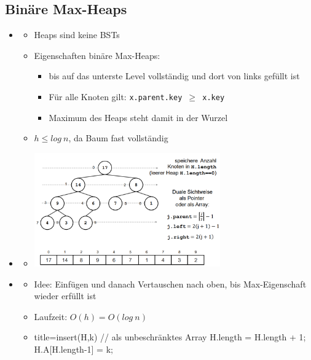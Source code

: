 \documentclass[
    12pt,
    a4paper,
    ngerman,
    color=3b,%
    marginpar=false,
    colorback=false,
    leqno,
]{tudaexercise}
\begin{document}
    \subsection{Binäre Max-Heaps}\label{Binaere Max-Heaps}
    \begin{itemize}
        \item {}
            \begin{itemize}
                \item Heaps sind keine BSTs
                \item Eigenschaften binäre Max-Heaps:
                    \begin{itemize}
                        \item bis auf das unterste Level vollständig und dort von links gefüllt ist
                        \item Für alle Knoten gilt: \texttt{x.parent.key $\geq$ x.key}
                        \item Maximum des Heaps steht damit in der Wurzel
                    \end{itemize}
                \item $h \leq log~n$, da Baum fast vollständig
            \end{itemize}

        \item {}
            \begin{itemize}
                \item[] \includegraphics[width=8cm]{pictures/heapArr.PNG}
            \end{itemize}

        \item {}
            \begin{itemize}
                \item Idee: Einfügen und danach Vertauschen nach oben, bis Max-Eigenschaft wieder erfüllt ist
                \item Laufzeit: $O(h) = O(log~n)$
                \item[]
                    \begin{ccode}[autogobble]{title={insert(H,k) // als unbeschränktes Array}}
                    H.length = H.length + 1;
                    H.A[H.length-1] = k;


\end{ccode}
\end{itemize}
\end{itemize}
\end{document}
